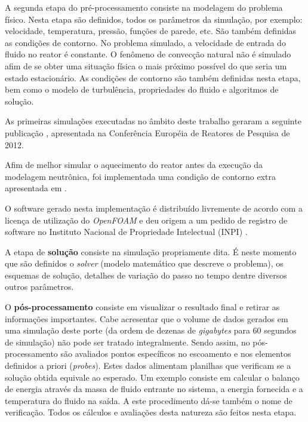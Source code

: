 \documentclass[12pt,openright,twoside,a4paper,english,french,spanish,brazil]{abntex2}
\begin{document}

A segunda etapa do pré-processamento consiste na modelagem do problema físico. Nesta etapa são definidos, 
todos os parâmetros da simulação, por exemplo: velocidade, temperatura, pressão, funções de parede, etc. 
São também definidas as condições de contorno. No problema simulado, a velocidade de entrada do fluido 
no reator é constante. O fenômeno de convecção natural não é simulado afim de se obter uma situação 
física o mais próximo possível do que seria um estado estacionário. As condições de contorno são 
também definidas nesta etapa, bem como o modelo de turbulência, propriedades do fluido e algoritmos 
de solução.

As primeiras simulações executadas no âmbito deste trabalho geraram a seguinte publicação \cite{Silva2012}, apresentada
na Conferência Européia de Reatores de Pesquisa de 2012.

Afim de melhor simular o aquecimento do reator antes da execução da modelagem neutrônica, foi implementada 
uma condição de contorno extra apresentada em \cite{Silva2013}.


O software gerado nesta implementação é distribuído livremente de acordo com a licença de utilização do 
\textit{OpenFOAM} e deu origem a um pedido de registro de software no 
Instituto Nacional de Propriedade Intelectual (INPI) \cite{TRIGAfuel2013}. 

A etapa de \textbf{solução} consiste na simulação propriamente dita. É neste momento que são definidos o 
\textit{solver} (modelo matemático que descreve o problema), os esquemas de solução, detalhes de variação do 
passo no tempo dentre diversos outros parâmetros.


O \textbf{pós-processamento} consiste em visualizar o resultado final e retirar as informações importantes. Cabe acresentar 
que o volume de dados gerados em uma simulação deste porte (da ordem de dezenas de \textit{gigabytes} para 60 
segundos de simulação) não pode ser tratado integralmente. Sendo assim, no pós-processamento são avaliados 
pontos específicos no escoamento e nos elementos definidos a priori (\textit{probes}). Estes dados 
alimentam planilhas que verificam se a solução obtida equivale ao esperado. Um exemplo consiste em calcular o 
balanço de energia através da massa de fluido entrante no sistema, a energia fornecida e a temperatura 
do fluido na saída. A este procedimento dá-se também o nome de verificação.%
Todos os cálculos e avaliações desta natureza são feitos nesta etapa.
\end{document}
